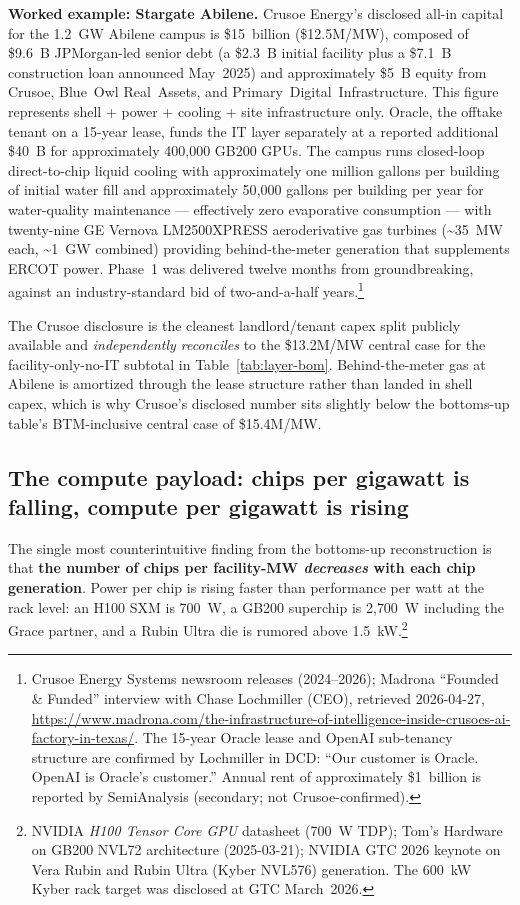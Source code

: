 \textbf{Worked example: Stargate Abilene.} Crusoe Energy's disclosed all-in capital for the 1.2~GW Abilene campus is \$15~billion (\$12.5M/MW), composed of \$9.6~B JPMorgan-led senior debt (a \$2.3~B initial facility plus a \$7.1~B construction loan announced May~2025) and approximately \$5~B equity from Crusoe, Blue~Owl Real~Assets, and Primary~Digital~Infrastructure. This figure represents shell + power + cooling + site infrastructure only. Oracle, the offtake tenant on a 15-year lease, funds the IT layer separately at a reported additional \$40~B for approximately 400{,}000 GB200 GPUs. The campus runs closed-loop direct-to-chip liquid cooling with approximately one million gallons per building of initial water fill and approximately 50{,}000 gallons per building per year for water-quality maintenance --- effectively zero evaporative consumption --- with twenty-nine GE Vernova LM2500XPRESS aeroderivative gas turbines (\textasciitilde35~MW each, \textasciitilde1~GW combined) providing behind-the-meter generation that supplements ERCOT power. Phase~1 was delivered twelve months from groundbreaking, against an industry-standard bid of two-and-a-half years.\footnote{Crusoe Energy Systems newsroom releases (2024--2026); Madrona ``Founded \& Funded'' interview with Chase Lochmiller (CEO), retrieved 2026-04-27, \url{https://www.madrona.com/the-infrastructure-of-intelligence-inside-crusoes-ai-factory-in-texas/}. The 15-year Oracle lease and OpenAI sub-tenancy structure are confirmed by Lochmiller in DCD: ``Our customer is Oracle. OpenAI is Oracle's customer.'' Annual rent of approximately \$1~billion is reported by SemiAnalysis (secondary; not Crusoe-confirmed).}

The Crusoe disclosure is the cleanest landlord/tenant capex split publicly available and \emph{independently reconciles} to the \$13.2M/MW central case for the facility-only-no-IT subtotal in Table~\ref{tab:layer-bom}. Behind-the-meter gas at Abilene is amortized through the lease structure rather than landed in shell capex, which is why Crusoe's disclosed number sits slightly below the bottoms-up table's BTM-inclusive central case of \$15.4M/MW.

\subsection{The compute payload: chips per gigawatt is falling, compute per gigawatt is rising}
\label{subsec:compute-payload}

The single most counterintuitive finding from the bottoms-up reconstruction is that \textbf{the number of chips per facility-MW \emph{decreases} with each chip generation}. Power per chip is rising faster than performance per watt at the rack level: an H100 SXM is 700~W, a GB200 superchip is 2{,}700~W including the Grace partner, and a Rubin Ultra die is rumored above 1.5~kW.\footnote{NVIDIA \emph{H100 Tensor Core GPU} datasheet (700~W TDP); Tom's Hardware on GB200 NVL72 architecture (2025-03-21); NVIDIA GTC 2026 keynote on Vera Rubin and Rubin Ultra (Kyber NVL576) generation. The 600~kW Kyber rack target was disclosed at GTC March~2026.}

